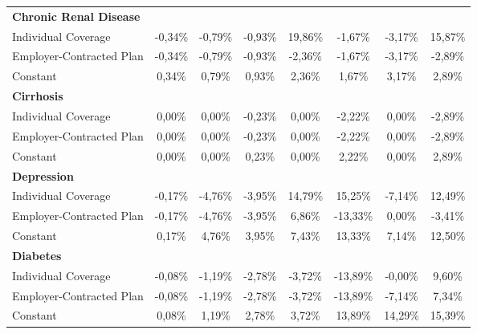 \documentclass{article}
\begin{document}
\begin{table*}
{\begin{tabular}{l*{7}{c}}
\midrule
\textbf{Chronic Renal Disease} & & & & & & & \\

Individual Coverage 	&  -0,34\%         &  -0,79\%\sym{*}  &  -0,93\%\sym{*}  &  19,86\%         &  -1,67\%         &  -3,17\%\sym{*}  &  15,87\%         \\
Employer-Contracted Plan&  -0,34\%         &  -0,79\%\sym{*}  &  -0,93\%\sym{*}  &  -2,36\%\sym{**} &  -1,67\%         &  -3,17\%\sym{*}  &  -2,89\%         \\
Constant            	&   0,34\%         &   0,79\%\sym{*}  &   0,93\%\sym{*}  &   2,36\%\sym{**} &   1,67\%         &   3,17\%\sym{*}  &   2,89\%         \\

\midrule
\textbf{Cirrhosis} & & & & & & & \\

Individual Coverage 	&   0,00\%         &   0,00\%         &  -0,23\%         &   0,00\%         &  -2,22\%\sym{*}  &   0,00\%         &  -2,89\%         \\
Employer-Contracted Plan&   0,00\%         &   0,00\%         &  -0,23\%         &   0,00\%         &  -2,22\%\sym{*}  &   0,00\%         &  -2,89\%         \\
Constant            	&   0,00\%         &   0,00\%         &   0,23\%         &   0,00\%         &   2,22\%\sym{*}  &   0,00\%         &   2,89\%         \\

\midrule
\textbf{Depression} & & & & & & & \\

Individual Coverage 	&  -0,17\%         &  -4,76\%\sym{***}&  -3,95\%\sym{***}&  14,79\%         &  15,25\%         &  -7,14\%\sym{**} &  12,49\%         \\
Employer-Contracted Plan&  -0,17\%         &  -4,76\%\sym{***}&  -3,95\%\sym{***}&   6,86\%         & -13,33\%\sym{***}&   0,00\%         &  -3,41\%         \\
Constant            	&   0,17\%         &   4,76\%\sym{***}&   3,95\%\sym{***}&   7,43\%\sym{***}&  13,33\%\sym{***}&   7,14\%\sym{**} &  12,50\%\sym{***}\\

\midrule
\textbf{Diabetes} & & & & & & & \\

Individual Coverage 	&  -0,08\%         &  -1,19\%\sym{*}  &  -2,78\%\sym{**} &  -3,72\%\sym{***}& -13,89\%\sym{***}&  -0,00\%         &   9,60\%         \\
Employer-Contracted Plan&  -0,08\%         &  -1,19\%\sym{*}  &  -2,78\%\sym{**} &  -3,72\%\sym{***}& -13,89\%\sym{***}&  -7,14\%         &   7,34\%         \\
Constant            	&   0,08\%         &   1,19\%\sym{*}  &   2,78\%\sym{**} &   3,72\%\sym{***}&  13,89\%\sym{***}&  14,29\%\sym{***}&  15,39\%\sym{***}\\


\end{tabular}}
\end{table*}
\end{document}
